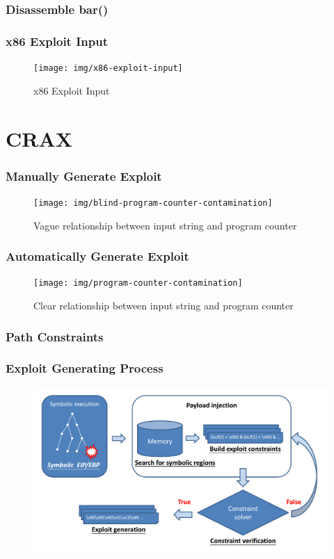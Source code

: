 \documentclass[t,xcolor=table,usenames,dvipsnames]{beamer}
\begin{document}
\begin{frame}
    \frametitle{Disassemble bar()}
    
\end{frame}

\begin{frame}
    \frametitle{x86 Exploit Input}
    \begin{figure}
    \texttt{[image: img/x86-exploit-input]}
    \caption{x86 Exploit Input}
    \end{figure}
\end{frame}

\section{CRAX}
\begin{frame}
    \sectionpage
\end{frame}

\begin{frame}
    \frametitle{Manually Generate Exploit}
    \begin{figure}
    \texttt{[image: img/blind-program-counter-contamination]}
    \caption{Vague relationship between input string and program counter}
    \end{figure}
\end{frame}

\begin{frame}
    \frametitle{Automatically Generate Exploit}
    \begin{figure}
    \texttt{[image: img/program-counter-contamination]}
    \caption{Clear relationship between input string and program counter}
    \end{figure}
    
\end{frame}

\begin{frame}
    \frametitle{Path Constraints}
    
    
\end{frame}

\begin{frame}
    \frametitle{Exploit Generating Process}
    \begin{figure}
    \includegraphics[width=1.0\textwidth]{img/exploit-generating-process}
    \end{figure}
\end{frame}
\end{document}
